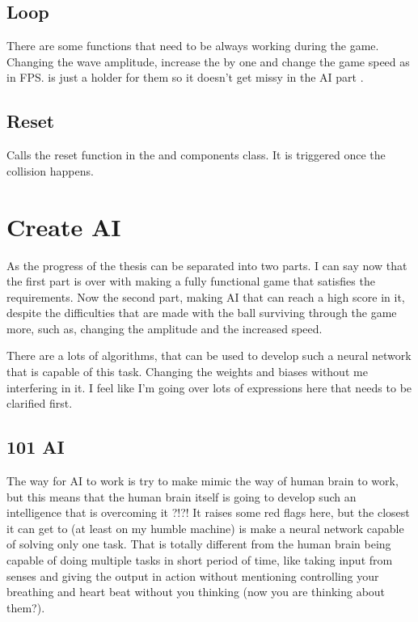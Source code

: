 \subsection{Loop}
There are some functions that need to be always working during the game. Changing the wave amplitude, increase the  by one and change the game speed as in FPS.  is just a holder for them so it doesn't get missy in the AI part .

\subsection{Reset}
Calls the reset function in the  and  components class. It is triggered once the collision happens.

\section{Create AI}\label{create-ai}

As the progress of the thesis can be separated into two parts. I can say now that the first part is over with making a fully functional game that satisfies the requirements. Now the second part, making AI that can reach a high score in it, despite the difficulties that are made with the ball surviving through the game more, such as, changing the amplitude and the increased speed.

There are a lots of algorithms, that can be used to develop such a neural network that is capable of this task. Changing the weights and biases without me interfering in it. I feel like I'm going over lots of expressions here that needs to be clarified first.

\subsection{101 AI}\label{sec:101-ai}
The way for AI to work is try to make mimic the way of human brain to work, but this means that the human brain itself is going to develop such an intelligence that is overcoming it ?!?! It raises some red flags here, but the closest it can get to (at least on my humble machine) is make a neural network capable of solving only one task. That is totally different from the human brain being capable of doing multiple tasks in short period of time, like taking input from senses and giving the output in action without mentioning controlling your breathing and heart beat without you thinking (now you are thinking about them?).

